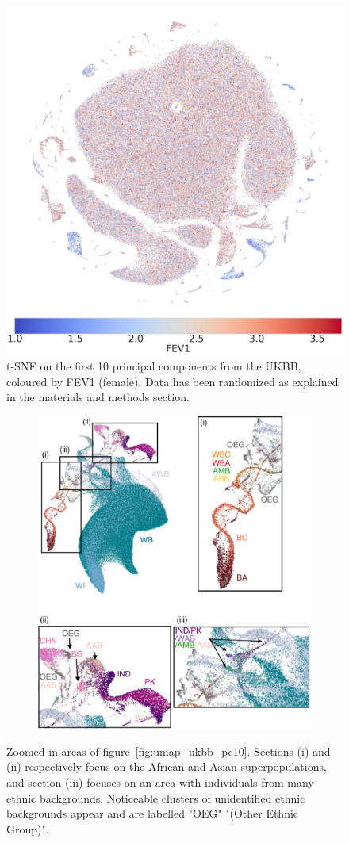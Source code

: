 \documentclass[12pt]{pnas-new}
\begin{document}
\begin{figure}
    \centering
    \includegraphics[width=0.4\columnwidth]{images/UKBB_TSNE_10PCs_DefaultPerplexity_2019410191255_3063_0_0_pct1_f.jpeg}
    \caption{t-SNE on the first 10 principal components from the UKBB, coloured by FEV1 (female). Data has been randomized as explained in the materials and methods section.}
    \label{fig:supp_ukbb_tsne_fev_f}
\end{figure}

\begin{figure}
    \centering
    \begin{subfigure}{0.8\textwidth}
    \includegraphics[width=\textwidth]{images/UKBB_UMAP_PC10_NN15_MD05_eth_combined_resized.pdf}
    \end{subfigure}
    \caption{Zoomed in areas of figure~\ref{fig:umap_ukbb_pc10}. Sections (i) and (ii) respectively focus on the African and Asian superpopulations, and section (iii) focuses on an area with individuals from many ethnic backgrounds. Noticeable clusters of unidentified ethnic backgrounds appear and are labelled "OEG" "(Other Ethnic Group)".}
    \label{fig:supp_ukbb_zoom}
\end{figure}
\end{document}
